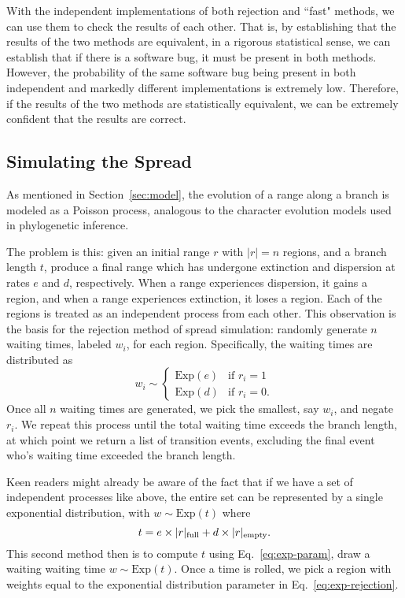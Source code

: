 \documentclass{article}
\begin{document}
With the independent implementations of both rejection and ``fast" methods, we
can use them to check the results of each other.
That is, by establishing that the results of the two methods are equivalent, in
a rigorous statistical sense, we can establish that if there is a software bug,
it must be present in both methods.
However, the probability of the same software bug being present in both
independent and markedly different implementations is extremely low.
Therefore, if the results of the two methods are statistically equivalent, we
can be extremely confident that the results are correct.

\subsection{Simulating the Spread}

As mentioned in Section~\ref{sec:model}, the evolution of a range along a
branch is modeled as a Poisson process, analogous to the character evolution
models used in phylogenetic inference.

The problem is this: given an initial range \( r \) with \( |r| = n \) regions,
and a branch length \( t \), produce a final range which has undergone
extinction and dispersion at rates \( e \) and \( d \), respectively.
When a range experiences dispersion, it gains a region, and when a range
experiences extinction, it loses a region. 
Each of the regions is treated as an independent process from each other.
This observation is the basis for the rejection method of spread simulation:
randomly generate \( n \) waiting times, labeled \( w_i \), for each region.
Specifically, the waiting times are distributed as
\begin{equation}
	\label{eq:exp-rejection} w_i \sim
	\begin{cases}
		\text{Exp}(e) & \text{if } r_i
		= 1                            \\ \text{Exp}(d) & \text{if } r_i = 0.
	\end{cases}
\end{equation}
Once all $n$ waiting times are generated, we pick the smallest, say $w_i$, and
negate $r_i$.
We repeat this process until the total waiting time exceeds the branch length,
at which point we return a list of transition events, excluding the final event
who's waiting time exceeded the branch length.

Keen readers might already be aware of the fact that if we have a set of
independent processes like above, the entire set can be represented by a single
exponential distribution, with \(w \sim \text{Exp}(t) \) where
\begin{equation}
	\label{eq:exp-param} t = e \times |r|_\text{full} + d \times |r|_\text{empty}.
\end{equation}
This second method then is to compute \( t \) using Eq.~\ref{eq:exp-param},
draw a waiting waiting time \( w \sim \text{Exp}(t) \).
Once a time is rolled, we pick a region with weights equal to the exponential
distribution parameter in Eq.~\ref{eq:exp-rejection}.
\end{document}
